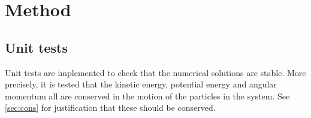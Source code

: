 \section{Method}

\subsection{Unit tests}
Unit tests are implemented to check that the numerical solutions are stable. More precisely, it is tested that the kinetic energy, potential energy and angular momentum all are conserved in the motion of the particles in the system. See  \ref{sec:cons} for justification that these should be conserved. 